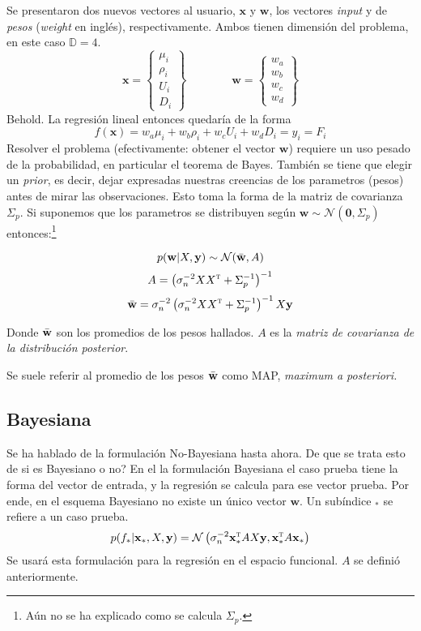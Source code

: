 \documentclass{article}
\newcommand{\vectorbold}[1]{\mathbf{#1}}
\newcommand{\Dim}{\mathbb{D}}
\newcommand{\T}{\textsc{t}}
\newcommand{\func}{f}
\newcommand{\GD}{\mathcal{N}}
\begin{document}
Se presentaron dos nuevos vectores al usuario, $\vectorbold{x}$ y $\vectorbold{w}$, los vectores \textit{input} y de \textit{pesos} (\textit{weight} en inglés), respectivamente. Ambos tienen dimensión del problema, en este caso $\Dim=4$.
\[ \vectorbold{x} =
\begin{Bmatrix}
\mu_i \\
\rho_i \\
U_i \\
D_i
\end{Bmatrix} \qquad \qquad
\vectorbold{w} =
\begin{Bmatrix}
w_a \\
w_b \\
w_c \\
w_d
\end{Bmatrix}
\]
Behold. La regresión lineal entonces quedaría de la forma
\[
\func(\vectorbold{x}) = w_a\mu_i +w_b\rho_i+w_cU_i+w_dD_i =y_i = F_i
\]
Resolver el problema (efectivamente: obtener el vector $\vectorbold{w}$) requiere un uso pesado de la probabilidad, en particular el teorema de Bayes. También se tiene que elegir un \textit{prior}, es decir, dejar expresadas nuestras creencias de los parametros (pesos) antes de mirar las observaciones. Esto toma la forma de la matriz de covarianza $\Sigma_p$. Si suponemos que los parametros se distribuyen según $\vectorbold{w} \sim \GD(\vectorbold{0},\Sigma_p)$ entonces:\footnote{Aún no se ha explicado como se calcula $\Sigma_p$. }

\[
p(\vectorbold{w}|X,\vectorbold{y}) \sim \GD(\Bar{\vectorbold{w}},A)
\]
\begin{equation}
   A = \left(\sigma_n^{-2}XX^{\T}+\Sigma_p^{-1}\right)^{-1}
\end{equation}
\begin{equation}
     \Bar{\vectorbold{w}} = \sigma_{n}^{-2}\left( \sigma_{n}^{-2}XX^{\T}+\Sigma_p^{-1} \right)^{-1}X\vectorbold{y}
\end{equation}

Donde $\Bar{\vectorbold{w}}$ son los promedios de los pesos hallados. $A$ es la \textit{matriz de covarianza de la distribución posterior}.

Se suele referir al promedio de los pesos $\Bar{\vectorbold{w}}$ como MAP, \textit{maximum a posteriori. }

\subsection{Bayesiana}
Se ha hablado de la formulación No-Bayesiana hasta ahora. De que se trata esto de si es Bayesiano o no?  En el la formulación Bayesiana el caso prueba tiene la forma del vector de entrada, y la regresión se calcula para ese vector prueba. Por ende, en el esquema Bayesiano no existe un único vector $\vectorbold{w}$. Un subíndice $_*$ se refiere a un caso prueba.
\begin{equation}
    p(\func_{*}|\vectorbold{x}_*,X,\vectorbold{y}) = \GD \left( \sigma_n^{-2}\vectorbold{x}_*^{\T}AX\vectorbold{y},\vectorbold{x}_*^\T A\vectorbold{x}_* \right)
\end{equation}
Se usará esta formulación para la regresión en el espacio funcional. $A$ se definió anteriormente.
\end{document}
